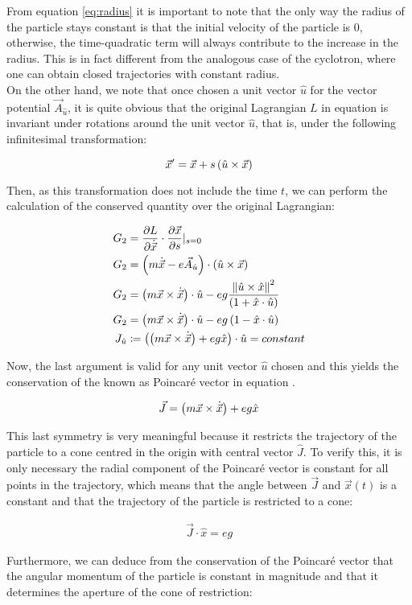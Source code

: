 From equation \ref{eq:radius} it is important to note that the only way the radius of the particle stays constant is that the initial velocity of the particle is $0$, otherwise, the time-quadratic term will always contribute to the increase in the radius. This is in fact different from the analogous case of the cyclotron, where one can obtain closed trajectories with constant radius.\\

On the other hand, we note that once chosen a unit vector $\hat{u}$ for the vector potential  $\vec{A}_{\hat{u}}$, it is quite obvious that the original Lagrangian $L$ in equation  is invariant under rotations around the unit vector $\hat{u}$, that is, under the following infinitesimal transformation:

\begin{equation}
\vec{x}' = \vec{x} + s\left( \hat{u}\times\vec{x} \right)
\label{eq:rotinv}
\end{equation}

Then, as this transformation does not include the time $t$, we can perform the calculation of the conserved quantity over the original Lagrangian:

\begin{align*}
G_2 &= \frac{\partial L}{\partial \dot{\vec{x}}}\cdot\frac{\partial \vec{x}}{\partial s} \rvert_{s=0}\\
G_2 &= \left( m\dot{\vec{x}} - e\vec{A}_{\hat{u}} \right)\cdot \left( \hat{u}\times\vec{x} \right) \\
G_2 &= \left( m\vec{x}\times\dot{\vec{x}} \right)\cdot\hat{u}-eg\frac{\left\lVert \hat{u}\times\hat{x} \right\rVert^2}{\left( 1+\hat{x}\cdot\hat{u} \right)}\\
G_2 &= \left( m\vec{x}\times\dot{\vec{x}} \right)\cdot\hat{u} -eg\left( 1-\hat{x}\cdot\hat{u} \right)\\
J_{\hat{u}} &\coloneqq \left( \left( m\vec{x}\times\dot{\vec{x}} \right)+ eg\hat{x} \right)\cdot\hat{u} = constant
\end{align*}

Now, the last argument is valid for any unit vector $\hat{u}$ chosen and this yields the conservation of the  known as Poincar\'e vector in equation .

\begin{equation}
\vec{J} = \left( m\vec{x}\times\dot{\vec{x}} \right)+ eg\hat{x}
\label{eq:poincarevec}
\end{equation}

This last symmetry is very meaningful because it restricts the trajectory of the particle to a cone centred in the origin with central vector $\hat{J}$. To verify this, it is only necessary the radial component of the Poincar\'e vector is constant for all points in the trajectory, which means that the angle between $\vec{J}$ and $\vec{x}(t)$ is a constant and that the trajectory of the particle is restricted to a cone:

\begin{align*}
\vec{J}\cdot\hat{x} = eg
\end{align*}

Furthermore, we can deduce from the conservation of the Poincar\'e vector that the angular momentum of the particle is constant in magnitude and that it determines the aperture of the cone of restriction:





